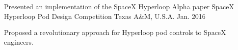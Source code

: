 \begin{cventries}
  \cventry
    {Presented an implementation of the SpaceX Hyperloop Alpha paper}
    {SpaceX Hyperloop Pod Design Competition}
    {Texas A\&M, U.S.A.}
    {Jan. 2016}
    {
      \begin{cvitems}
        \item {Proposed a revolutionary approach for Hyperloop pod controls to SpaceX engineers.}
      \end{cvitems}
    }
\end{cventries}
